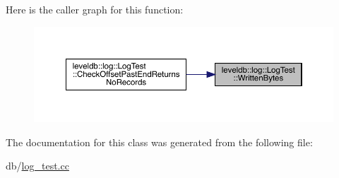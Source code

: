 Here is the caller graph for this function\+:
\nopagebreak
\begin{figure}[H]
\begin{center}
\leavevmode
\includegraphics[width=350pt]{classleveldb_1_1log_1_1_log_test_a602824b02f9220d6813768f6f700db47_icgraph}
\end{center}
\end{figure}


The documentation for this class was generated from the following file\+:\begin{DoxyCompactItemize}
\item 
db/\mbox{\hyperlink{log__test_8cc}{log\+\_\+test.\+cc}}\end{DoxyCompactItemize}

